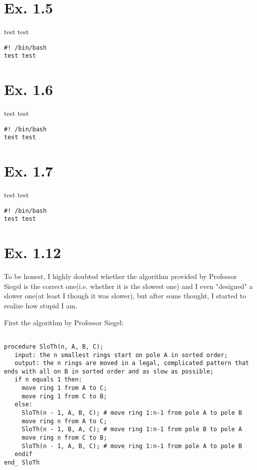 \documentclass[a4paper,11pt]{article}
\theoremstyle{mytheor}
\begin{document}
\section*{Ex. 1.5}
test test
\begin{lstlisting}[label={list:fifth},caption=Sample Bash code.]
#! /bin/bash
test test
\end{lstlisting}

\section*{Ex. 1.6}
test test
\begin{lstlisting}[label={list:sixth},caption=Sample Bash code.]
#! /bin/bash
test test
\end{lstlisting}


\section*{Ex. 1.7}
test test
\begin{lstlisting}[label={list:seventh},caption=Sample Bash code.]
#! /bin/bash
test test
\end{lstlisting}



\section*{Ex. 1.12}

To be honest, I highly doubted whether the algorithm provided by Professor Siegel is the correct one(i.e. whether it is the slowest one) and I even "designed" a slower one(at least I though it was slower), but after some thought, I started to realize how stupid I am.

First the algorithm by Professor Siegel:

\begin{lstlisting}[label={list:eighth},caption=Pseudo code -- slow Towers of Hanoi.]

procedure SloTh(n, A, B, C);
   input: the n smallest rings start on pole A in sorted order;
   output: the n rings are moved in a legal, complicated pattern that ends with all on B in sorted order and as slow as possible;
   if n equals 1 then:
     move ring 1 from A to C;
     move ring 1 from C to B;
   else:
     SloTh(n - 1, A, B, C); # move ring 1:n-1 from pole A to pole B
     move ring n from A to C;
     SloTh(n - 1, B, A, C); # move ring 1:n-1 from pole B to pole A
     move ring n from C to B;
     SloTh(n - 1, A, B, C); # move ring 1:n-1 from pole A to pole B
   endif
end_ SloTh

\end{lstlisting}
\end{document}
